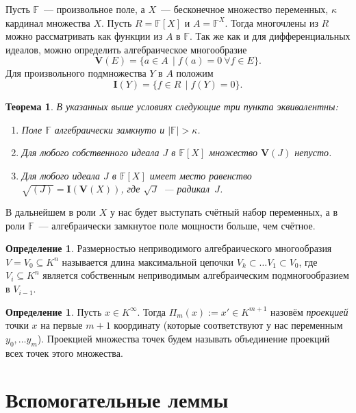 \documentclass[16pt]{article}
\theoremstyle{plain1}
\theoremstyle{plain2}
\theoremstyle{plain}
\newtheorem{theorem}{Теорема}
\theoremstyle{plain3}
\theoremstyle{definition}
\newtheorem{definition}[theorem2]{Определение}
\theoremstyle{remark}
\begin{document}
Пусть $\mathbb{F}$~--- произвольное поле, а $X$~--- бесконечное множество переменных, $\kappa$ кардинал множества $X$. Пусть $R=\mathbb{F}[X]$ и $A=\mathbb{F}^X$. Тогда многочлены из
$R$ можно рассматривать как функции из $A$ в $\mathbb{F}$. Так же как и для
дифференциальных идеалов, можно определить алгебраическое многообразие $$\mathbf{V}(E)=\{a\in A\,
\mid f(a)=0~\forall f\in E\}.$$ Для произвольного подмножества $Y$
в $A$ положим
$$
 \mathbf{I}(Y)=\{f \in R\, \mid f(Y)=0\}.
$$

\begin{theorem}\label{theorem:th 0 for alg}
В указанных выше условиях следующие три пункта эквивалентны:

\begin{enumerate}
\item Поле $\mathbb{F}$ алгебраически замкнуто и $|\mathbb{F}|>\kappa$.

\item Для любого собственного идеала $J$ в $\mathbb{F}[X]$ множество
$\mathbf{V}(J)$ непусто.

\item Для любого идеала $J$ в $\mathbb{F}[X]$ имеет место равенство
$\sqrt{(J)}=\mathbf{I}(\mathbf{V}(X))$, где $\sqrt{J}$~--- радикал~$J$.
\end{enumerate}
\cite[Section~1, Theorem]{Lang}
\end{theorem}

В дальнейшем в роли $X$ у нас будет выступать счётный набор
переменных, а в роли $\mathbb{F}$~--- алгебраически замкнутое поле мощности больше, чем счётное.


\begin{definition} Размерностью неприводимого алгебраического многообразия
${V}={V}_0\subseteq K^n$ называется длина максимальной цепочки
${V}_k\subset\ldots{V}_1\subset{V}_0$, где
${V}_i\subseteq K^n$ является собственным неприводимым алгебраическим подмногообразием
в ${V}_{i-1}$.
\end{definition}

\begin{definition}
Пусть $x\in K^{\infty}$. Тогда $\Pi_m(x):=x'\in K^{m+1}$ назовём \emph{проекцией}
точки $x$ на первые $m+1$ координату (которые соответствуют у нас
переменным $y_0,\ldots y_m$). Проекцией множества точек будем называть объединение проекций всех точек этого множества.
\end{definition}


\section{Вспомогательные леммы}
\end{document}
